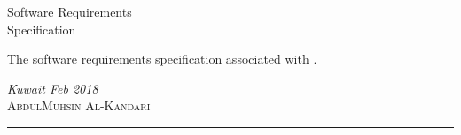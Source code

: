 \begin{titlepage}

\noindent
\titlefont Software Requirements\\ Specification\par
\epigraph{The software requirements specification associated with \printproduct.}%
{\textit{Kuwait Feb 2018}\\ \textsc{AbdulMuhsin Al-Kandari}}
\null\vfill
\vspace*{1cm}
\noindent
\hfill
\begin{minipage}{0.675\linewidth}
    \begin{flushright}
        \printauthor
    \end{flushright}
\end{minipage}
%
\begin{minipage}{0.02\linewidth}
    \rule{1pt}{125pt}
\end{minipage}
\titlepagedecoration
\end{titlepage}
